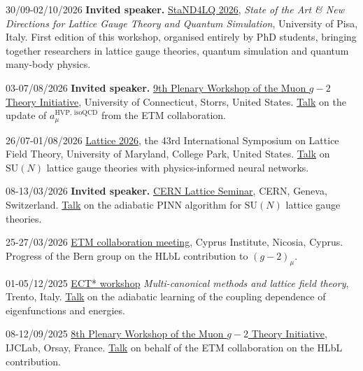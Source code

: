 \begin{cvlist}
\item[30/09-02/10/2026] \textbf{Invited speaker.} \href{https://agenda.infn.it/event/53069/}{StaND4LQ 2026}, \textit{State
of the Art \& New Directions for Lattice Gauge Theory and Quantum Simulation}, University of Pisa, Italy.
First edition of this workshop, organised entirely by PhD students, bringing together researchers in
lattice gauge theories, quantum simulation and quantum many-body physics.

\item[03-07/08/2026] \textbf{Invited speaker.} \href{https://indico.phys.uconn.edu/event/3/}{9th Plenary
Workshop of the Muon $g-2$ Theory Initiative}, University of Connecticut, Storrs, United States.
\href{https://indico.phys.uconn.edu/event/3/contributions/104/}{Talk} on the update of
$a_\mu^{\mathrm{HVP,\,isoQCD}}$ from the ETM collaboration.

\item[26/07-01/08/2026] \href{https://indico.global/event/16565/}{Lattice 2026}, the 43rd International
Symposium on Lattice Field Theory, University of Maryland, College Park, United States.
\href{https://indico.global/event/16565/contributions/156143/}{Talk} on
$\mathrm{SU}(N)$ lattice gauge theories with physics-informed neural networks.

\item[08-13/03/2026] \textbf{Invited speaker.} \href{https://indico.cern.ch/category/376/}{CERN Lattice
Seminar}, CERN, Geneva, Switzerland. \href{https://indico.cern.ch/event/1641317/}{Talk} on the adiabatic PINN algorithm
for $\mathrm{SU}(N)$ lattice gauge theories.

\item[25-27/03/2026] \href{https://indico.global/event/16475/}{ETM collaboration meeting}, Cyprus Institute,
Nicosia, Cyprus. Progress of the Bern group on the HLbL contribution to $(g-2)_\mu$.

\item[01-05/12/2025] \href{https://indico.ectstar.eu/event/248/}{ECT* workshop} \textit{Multi-canonical methods
and lattice field theory}, Trento, Italy.
\href{https://indico.ectstar.eu/event/248/contributions/6627/}{Talk} on the adiabatic learning of the
coupling dependence of eigenfunctions and energies.

\item[08-12/09/2025] \href{https://indico.ijclab.in2p3.fr/event/11652/}{8th Plenary Workshop of the Muon $g-2$
Theory Initiative}, IJCLab, Orsay, France.
\href{https://indico.ijclab.in2p3.fr/event/11652/contributions/39079/}{Talk} on behalf of the ETM
collaboration on the HLbL contribution.


\end{cvlist}
